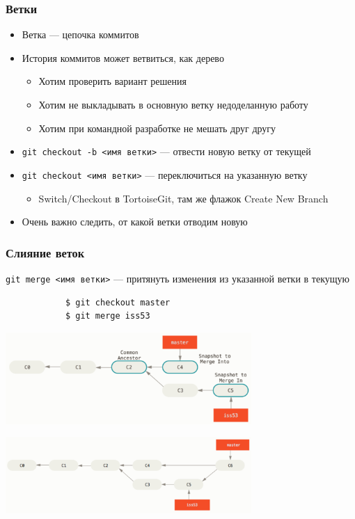 \documentclass{../slides-style}
\begin{document}
    \begin{frame}[fragile]
        \frametitle{Ветки}
        \begin{itemize}
            \item Ветка --- цепочка коммитов
            \item История коммитов может ветвиться, как дерево
            \begin{itemize}
                \item Хотим проверить вариант решения
                \item Хотим не выкладывать в основную ветку недоделанную работу
                \item Хотим при командной разработке не мешать друг другу
            \end{itemize}
            \item \verb|git checkout -b <имя ветки>| --- отвести новую ветку от текущей
            \item \verb|git checkout <имя ветки>| --- переключиться на указанную ветку
            \begin{itemize}
                \item Switch/Checkout в TortoiseGit, там же флажок Create New Branch
            \end{itemize}
            \item Очень важно следить, от какой ветки отводим новую
        \end{itemize}
    \end{frame}

    \begin{frame}[fragile]
        \frametitle{Слияние веток}
        \verb|git merge <имя ветки>| --- притянуть изменения из указанной ветки в текущую
        \begin{verbatim}
            $ git checkout master
            $ git merge iss53
        \end{verbatim}
        \begin{center}
            \includegraphics[width=0.7\textwidth]{merge.png}
        \end{center}
        \begin{center}
            \includegraphics[width=0.7\textwidth]{mergeResult.png}
        \end{center}
    \end{frame}
\end{document}
